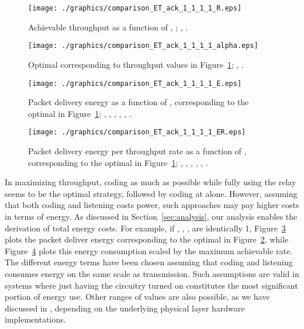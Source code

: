 \documentclass[journal, letterpaper]{IEEEtran}
\begin{document}
\begin{itemize}
\begin{figure}[t!]
  \centering
    \texttt{[image: ./graphics/comparison\_ET\_ack\_1\_1\_1\_1\_R.eps]}
    \caption{Achievable throughput as a function of , ; , .}
    \label{fig:comparison_psd}
\end{figure}
\begin{figure}[t!]
\centering
  \texttt{[image: ./graphics/comparison\_ET\_ack\_1\_1\_1\_1\_alpha.eps]}
  \caption{Optimal  corresponding to throughput values in Figure~\ref{fig:comparison_psd}; , .}
  \label{fig:comparison_psd_alpha}
\end{figure}
\begin{figure}[t!]
  \centering
    \texttt{[image: ./graphics/comparison\_ET\_ack\_1\_1\_1\_1\_E.eps]}
    \caption{Packet delivery energy  as a function of , corresponding to the optimal  in Figure~\ref{fig:comparison_psd}; , , , , , .}
    \label{fig:comparison_ET_ack_1_1_1_1_E}
 \end{figure}
\begin{figure}[t!]
\centering
  \texttt{[image: ./graphics/comparison\_ET\_ack\_1\_1\_1\_1\_ER.eps]}
  \caption{Packet delivery energy per throughput rate  as a function of , corresponding to the optimal  in Figure~\ref{fig:comparison_psd}; , , , , , .}
  \label{fig:comparison_ET_ack_1_1_1_1_ER}
\end{figure}

In maximizing throughput, coding as much as possible while fully using the relay  seems to be the optimal strategy, followed by coding at  alone. However, assuming that both coding and listening costs power, such approaches may pay higher costs in terms of energy. As discussed in Section~\ref{sec:analysis}, our analysis enables the derivation of total energy costs. For example, if , , ,  are identically 1, Figure~\ref{fig:comparison_ET_ack_1_1_1_1_E} plots the packet deliver energy corresponding to the optimal  in Figure~\ref{fig:comparison_psd_alpha}, while Figure~\ref{fig:comparison_ET_ack_1_1_1_1_ER} plots this energy consumption scaled by the maximum achievable rate. The different energy terms have been chosen assuming that coding and listening consumes energy on the same scale as transmission. Such assumptions are valid in systems where just having the circuitry turned on constitutes the most significant portion of energy use. Other ranges of values are also possible, as we have discussed in \cite{shi2011both}, depending on the underlying physical layer hardware implementations.


\end{itemize}
\end{document}
